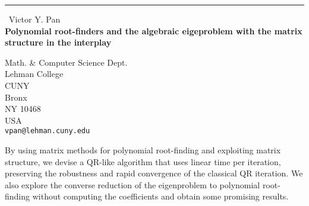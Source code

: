 \documentclass{report}
\begin{document}
\begin{center}
\rule{6in}{1pt} \
{\large Victor Y. Pan \\
{\bf Polynomial root-finders and the algebraic eigeproblem with the matrix structure in the interplay}}

Math. & Computer Science Dept. \\ Lehman College \\ CUNY \\ Bronx \\ NY 10468 \\ USA
\\
{\tt vpan@lehman.cuny.edu}\end{center}

By using matrix methods for polynomial root-finding and exploiting matrix
structure, we devise a QR-like algorithm that uses linear time per
iteration, preserving the robustness and rapid convergence of the
classical QR iteration. We also explore the converse reduction of the
eigenproblem to polynomial root-finding without computing the
coefficients and obtain some promising results.
\end{document}
